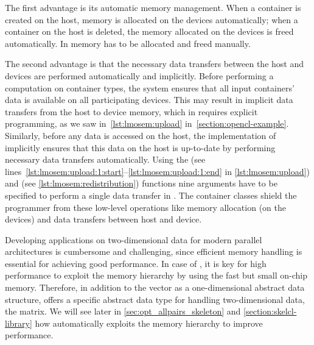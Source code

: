 The first advantage is its automatic memory management.
When a container is created on the host, memory is allocated on the devices automatically;
when a container on the host is deleted, the memory allocated on the devices is freed automatically.
In \OpenCL memory has to be allocated and freed manually.

The second advantage is that the necessary data transfers between the host and devices are performed automatically and implicitly.
Before performing a computation on container types, the \SkelCL system ensures that all input containers' data is available on all participating devices.
This may result in implicit data transfers from the host to device memory, which in \OpenCL requires explicit programming, as we saw in~\autoref{lst:lmosem:upload} in~\autoref{section:opencl-example}.
Similarly, before any data is accessed on the host, the implementation of \SkelCL implicitly ensures that this data on the host is up-to-date by performing necessary data transfers automatically.
Using the  (see lines~\ref{lst:lmosem:upload:1:start}--\ref{lst:lmosem:upload:1:end} in \autoref{lst:lmosem:upload}) and  (see \autoref{lst:lmosem:redistribution}) functions nine arguments have to be specified to perform a single data transfer in \OpenCL.
The \SkelCL container classes shield the programmer from these low-level operations like memory allocation (on the devices) and data transfers between host and device.

Developing applications on two-dimensional data for modern parallel architectures is cumbersome and challenging, since efficient memory handling is essential for achieving good performance.
In case of \GPUs, it is key for high performance to exploit the memory hierarchy by using the fast but small on-chip memory.
Therefore, in addition to the vector as a one-dimensional abstract data structure, \SkelCL offers a specific abstract data type for handling two-dimensional data, the matrix.
We will see later in \autoref{sec:opt_allpairs_skeleton} and \autoref{section:skelcl-library} how \SkelCL automatically exploits the memory hierarchy to improve performance.



